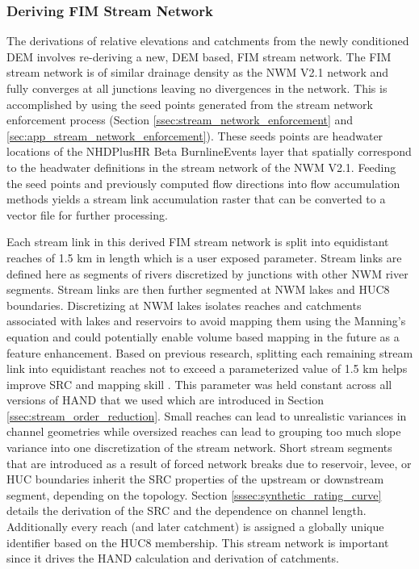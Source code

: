\documentclass[draft]{dependencies/agujournal2019}
\begin{document}
\subsubsection{Deriving FIM Stream Network}
\label{sssec:deriving_fim_stream_network}
%
The derivations of relative elevations and catchments from the newly conditioned DEM involves re-deriving a new, DEM based, FIM stream network. 
The FIM stream network is of similar drainage density as the NWM V2.1 network and fully converges at all junctions leaving no divergences in the network.
This is accomplished by using the seed points generated from the stream network enforcement process (Section \ref{ssec:stream_network_enforcement} and \ref{sec:app_stream_network_enforcement}).
These seeds points are headwater locations of the NHDPlusHR Beta BurnlineEvents layer that spatially correspond to the headwater definitions in the stream network of the NWM V2.1.
Feeding the seed points and previously computed flow directions into flow accumulation methods \cite{wallis2009parallel,tarboton1997new,tarboton2005terrain} yields a stream link accumulation raster that can be converted to a vector file for further processing.

Each stream link in this derived FIM stream network is split into equidistant reaches of 1.5 km in length which is a user exposed parameter.
Stream links are defined here as segments of rivers discretized by junctions with other NWM river segments.
Stream links are then further segmented at NWM lakes and HUC8 boundaries.
Discretizing at NWM lakes isolates reaches and catchments associated with lakes and reservoirs to avoid mapping them using the Manning's equation and could potentially enable volume based mapping in the future as a feature enhancement.
Based on previous research, splitting each remaining stream link into equidistant reaches not to exceed a parameterized value of 1.5 km helps improve SRC and mapping skill \cite{garousi2019terrain,godbout2019error,zheng2018geoflood}.
This parameter was held constant across all versions of HAND that we used which are introduced in Section \ref{ssec:stream_order_reduction}.
Small reaches can lead to unrealistic variances in channel geometries while oversized reaches can lead to grouping too much slope variance into one discretization of the stream network.
Short stream segments that are introduced as a result of forced network breaks due to reservoir, levee, or HUC boundaries inherit the SRC properties of the upstream or downstream segment, depending on the topology.
Section \ref{sssec:synthetic_rating_curve} details the derivation of the SRC and the dependence on channel length. 
Additionally every reach (and later catchment) is assigned a globally unique identifier based on the HUC8 membership.
This stream network is important since it drives the HAND calculation and derivation of catchments.
%
\end{document}
